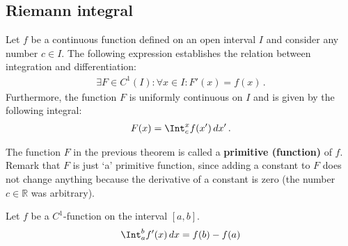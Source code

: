 \subsection{Riemann integral}


    \begin{theorem}\label{calculus:first_fundamental_theorem}
        Let $f$ be a continuous function defined on an open interval $I$ and consider any number $c\in I$. The following expression establishes the relation between integration and differentiation:
        \begin{gather}
            \exists F\in C^1(I):\forall x\in I:F'(x)=f(x)\,.
        \end{gather}
        Furthermore, the function $F$ is uniformly continuous on $I$ and is given by the following integral:
        \begin{gather}
            F(x) = \Int_c^xf(x')\,dx'\,.
        \end{gather}
    \end{theorem}

    \begin{remark}
        The function $F$ in the previous theorem is called a \textbf{primitive (function)} of $f$. Remark that $F$ is just `a' primitive function, since adding a constant to $F$ does not change anything because the derivative of a constant is zero (the number $c\in\mathbb{R}$ was arbitrary).
    \end{remark}

    \begin{theorem}\label{calculus:second_fundamental_theorem}
        Let $f$ be a $C^1$-function on the interval $[a,b]$.
        \begin{gather}
            \Int_a^bf'(x)\,dx = f(b) - f(a)
        \end{gather}
    \end{theorem}

